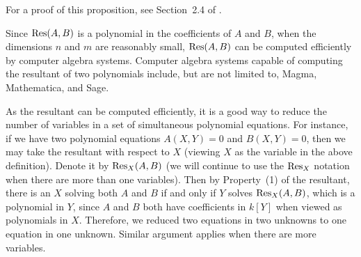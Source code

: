 For a proof of this proposition, see Section~2.4 of \cite{MR2316407}.

\begin{remark}
  Since $\mathrm{Res}(A, B)$ is a polynomial in the coefficients of $A$ and
  $B$, when the dimensions $n$ and $m$ are reasonably small, $\mathrm{Res}(A,
  B)$ can be computed efficiently by computer algebra
  systems. Computer algebra systems capable of computing the resultant
  of two polynomials include, but are not limited to, Magma,
  Mathematica, and Sage.

  As the resultant can be computed efficiently, it is a good way to
  reduce the number of variables in a set of simultaneous polynomial
  equations. For instance, if we have two polynomial equations $A(X,
  Y) = 0$ and $B(X, Y) = 0$, then we may take the resultant with
  respect to $X$ (viewing $X$ as the variable in the above
  definition). Denote it by $\mathrm{Res}_X(A, B)$ (we will continue to use
  the $\mathrm{Res}_X$ notation when there are more than one variables). Then
  by Property~(1) of the resultant, there is an $X$ solving both $A$
  and $B$ if and only if $Y$ solves $\mathrm{Res}_X(A, B)$, which is a
  polynomial in $Y$, since $A$ and $B$ both have coefficients in
  $k[Y]$ when viewed as polynomials in $X$. Therefore, we reduced two
  equations in two unknowns to one equation in one unknown. Similar
  argument applies when there are more variables.
\end{remark}

